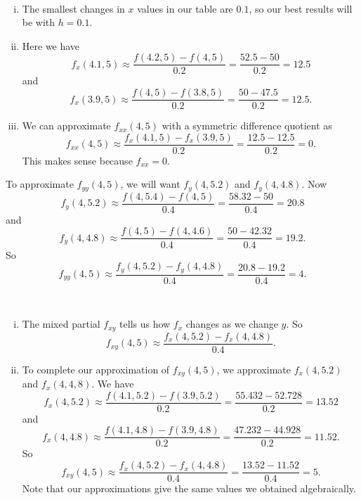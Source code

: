 \begin{activitySolution}
\ba
\item ~
	\begin{enumerate}[i.]
	\item The smallest changes in $x$ values in our table are $0.1$, so our best results will be with $h = 0.1$. 

	\item Here we have 
\[f_{x}(4.1,5) \approx \frac{f(4.2,5) - f(4,5)}{0.2} = \frac{52.5-50}{0.2} = 12.5\]
and
\[f_{x}(3.9,5) \approx \frac{f(4,5) - f(3.8,5)}{0.2} = \frac{50-47.5}{0.2} = 12.5.\]
	\item We can approximate $f_{xx}(4,5)$ with a symmetric difference quotient as
\[f_{xx}(4,5) \approx \frac{f_x(4.1,5) - f_x(3.9,5)}{0.2} = \frac{12.5-12.5}{0.2} = 0.\]
This makes sense because $f_{xx} = 0$. 
	\end{enumerate}
	
\item To approximate $f_{yy}(4,5)$, we will want $f_y(4,5.2)$ and $f_y(4,4.8)$. Now
\[f_{y}(4,5.2) \approx \frac{f(4,5.4) - f(4,5)}{0.4} = \frac{58.32-50}{0.4} = 20.8\]
and
\[f_{y}(4,4.8) \approx \frac{f(4,5) - f(4,4.6)}{0.4} = \frac{50-42.32}{0.4} = 19.2.\]
So
\[f_{yy}(4,5) \approx \frac{f_y(4,5.2) - f_y(4,4.8)}{0.4} = \frac{20.8-19.2}{0.4} = 4.\]

\item ~
	\begin{enumerate}[i.]
	\item The mixed partial $f_{xy}$ tells us how $f_x$ changes as we change $y$. So 
	\[f_{xy}(4,5) \approx \frac{f_x(4,5.2) - f_x(4,4.8)}{0.4}.\]
	\item To complete our approximation of $f_{xy}(4,5)$, we approximate $f_x(4,5.2)$ and $f_x(4,4,8)$. We have 
	\[f_{x}(4,5.2) \approx \frac{f(4.1,5.2) - f(3.9,5.2)}{0.2} = \frac{55.432-52.728}{0.2} = 13.52\]
and
\[f_{x}(4,4.8) \approx \frac{f(4.1,4.8) - f(3.9,4.8)}{0.2} = \frac{47.232-44.928}{0.2} = 11.52.\]
So 
\[f_{xy}(4,5) \approx \frac{f_x(4,5.2) - f_x(4,4.8)}{0.4} = \frac{13.52-11.52}{0.4} = 5.\]
Note that our approximations give the same values we obtained algebraically. 
	\end{enumerate}

\ea
\end{activitySolution}
\aftera
